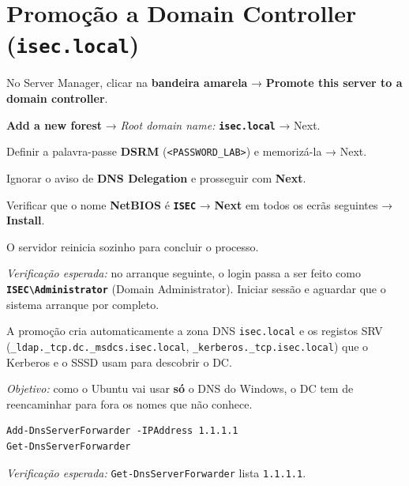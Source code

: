 
\section[Promoção a Domain Controller (isec.local)]{Promoção a Domain Controller (\texttt{isec.local})}



No Server Manager, clicar na \textbf{bandeira amarela} → \textbf{Promote this server to a domain controller}.


\textbf{Add a new forest} → \emph{Root domain name:} \textbf{\texttt{isec.local}} → Next.


Definir a palavra-passe \textbf{DSRM} (\texttt{\textless{}PASSWORD\_LAB\textgreater{}}) e memorizá-la → Next.


Ignorar o aviso de \textbf{DNS Delegation} e prosseguir com \textbf{Next}.


Verificar que o nome \textbf{NetBIOS} é \textbf{\texttt{ISEC}} → \textbf{Next} em todos os ecrãs seguintes → \textbf{Install}.


O servidor reinicia sozinho para concluir o processo.

\emph{Verificação esperada:} no arranque seguinte, o login passa a ser feito como \textbf{\texttt{ISEC\textbackslash{}Administrator}} (Domain Administrator). Iniciar sessão e aguardar que o sistema arranque por completo.

\begin{simplesbox}
A promoção cria automaticamente a zona DNS \texttt{isec.local} e os registos SRV (\texttt{\_ldap.\_tcp.dc.\_msdcs.isec.local}, \texttt{\_kerberos.\_tcp.isec.local}) que o Kerberos e o SSSD usam para descobrir o DC.
\end{simplesbox}


\emph{Objetivo:} como o Ubuntu vai usar \textbf{só} o DNS do Windows, o DC tem de reencaminhar para fora os nomes que não conhece.

\begin{lstlisting}[style=psstyle]
Add-DnsServerForwarder -IPAddress 1.1.1.1
Get-DnsServerForwarder
\end{lstlisting}

\emph{Verificação esperada:} \texttt{Get-DnsServerForwarder} lista \texttt{1.1.1.1}.

